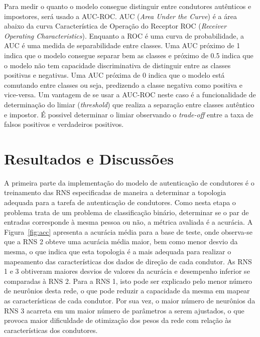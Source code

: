 \documentclass[conference,harvard,brazil,english]{sbatex}
\begin{document}
Para medir o quanto o modelo consegue distinguir entre condutores autênticos e impostores, será usado a AUC-ROC. AUC (\textit{Area Under the Curve}) é a área abaixo da curva Característica de Operação do Receptor ROC (\textit{Receiver Operating Characteristics}). Enquanto a ROC é uma curva de probabilidade, a AUC é uma medida de separabilidade entre classes. Uma AUC próximo de 1 indica que o modelo consegue separar bem as classes e próximo de 0.5 indica que o modelo não tem capacidade discriminativa de distinguir entre as classes positivas e negativas. Uma AUC próxima de 0 indica que o modelo está comutando entre classes ou seja, predizendo a classe negativa como positiva e vice-versa. Um vantagem de se usar a AUC-ROC neste caso é a funcionalidade de determinação do limiar (\textit{threshold}) que realiza a separação entre classes autêntico e impostor. É possivel determinar o limiar observando o \textit{trade-off} entre a taxa de falsos positivos e verdadeiros positivos.

\section{Resultados e Discussões}\label{sec:results}

A primeira parte da implementação do modelo de autenticação de condutores é o treinamento das RNS especificadas de maneira a determinar a topologia adequada para a tarefa de autenticação de condutores. Como nesta etapa o problema trata de um problema de classificação binário, determinar se o par de entradas corresponde à mesma pessoa ou não, a métrica avaliada é a acurácia. A Figura~\ref{fig:acc} apresenta a acurácia média para a base de teste, onde observa-se que a RNS 2 obteve uma acurácia média maior, bem como menor desvio da mesma, o que indica que esta topologia é a mais adequada para realizar o mapeamento das características dos dados de direção de cada condutor. As RNS 1 e 3 obtiveram maiores desvios de valores da acurácia e desempenho inferior se comparadas à RNS 2. Para a RNS 1, isto pode ser explicado pelo menor número de neurônios desta rede, o que pode reduzir a capacidade da mesma em mapear as características de cada condutor. Por sua vez, o maior número de neurônios da RNS 3 acarreta em um maior número de parâmetros a serem ajustados, o que provoca maior dificuldade de otimização dos pesos da rede com relação às características dos condutores. 
\end{document}
